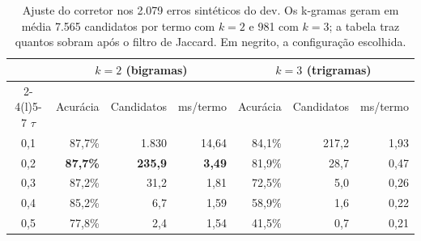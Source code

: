 \documentclass[10pt,a4paper]{article}
\begin{document}
\begin{table}[!htb]
\centering\small
\caption{Ajuste do corretor nos 2.079 erros sintéticos do dev. Os k-gramas geram em média 7.565 candidatos por termo com $k=2$ e 981 com $k=3$; a tabela traz quantos sobram após o filtro de Jaccard. Em negrito, a configuração escolhida.}
\label{tab:spell}
\begin{tabular}{@{}c rrr rrr@{}}
\toprule
 & \multicolumn{3}{c}{$k = 2$ (bigramas)} & \multicolumn{3}{c}{$k = 3$ (trigramas)} \\
\cmidrule(lr){2-4}\cmidrule(l){5-7}
$\tau$ & Acurácia & Candidatos & ms/termo & Acurácia & Candidatos & ms/termo \\
\midrule
0,1 & 87,7\% & 1.830 & 14,64 & 84,1\% & 217,2 & 1,93 \\
0,2 & \textbf{87,7\%} & \textbf{235,9} & \textbf{3,49} & 81,9\% & 28,7 & 0,47 \\
0,3 & 87,2\% & 31,2 & 1,81 & 72,5\% & 5,0 & 0,26 \\
0,4 & 85,2\% & 6,7 & 1,59 & 58,9\% & 1,6 & 0,22 \\
0,5 & 77,8\% & 2,4 & 1,54 & 41,5\% & 0,7 & 0,21 \\
\bottomrule
\end{tabular}
\end{table}
\end{document}

